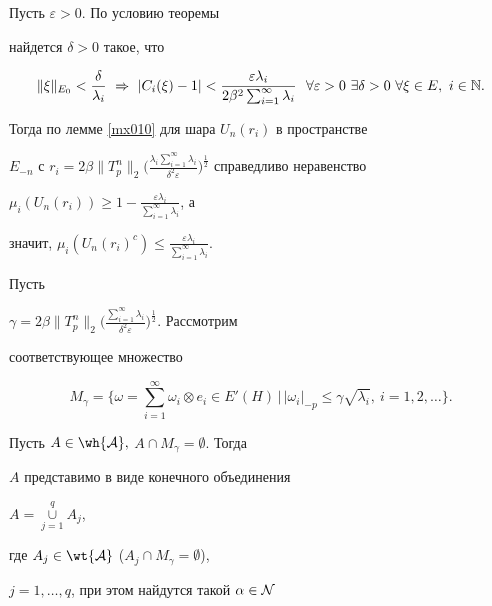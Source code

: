 \begin{pf}


Пусть $\varepsilon>0$. По условию теоремы


найдется $\delta>0$ такое, что


$$


\|\xi\|_{E_0}<\frac{\delta}{\lambda_i}\ \Rightarrow\


|C_i(\xi)-1 |<


\frac{\varepsilon\lambda_i}{2\beta^2\sum_{i=1}^{\infty}\lambda_i} \ \ 


\forall \varepsilon>0\ \exists \delta>0\ \forall \xi\in E, \ i\in\Bbb{N}.


$$


Тогда по лемме \ref{mx010} для шара $U_n(r_i)$ в пространстве


$E_{-n}$ с $r_i=2\beta\|T^n_p\|_2


\big(\frac{\lambda_i\sum_{i=1}^{\infty}\lambda_i}


{\delta^2\varepsilon}\big)^{\frac{1}{2}}$ справедливо неравенство


$\mu_i (U_n(r_i))\geq


1-\frac{\varepsilon\lambda_i}{\sum_{i=1}^{\infty}\lambda_i}$, а


значит, $\mu_i (U_n(r_i)^c)\leq


\frac{\varepsilon\lambda_i}{\sum_{i=1}^{\infty}\lambda_i}$.


Пусть


$\gamma=2\beta\|T^n_p\|_2 \big(\frac{\sum_{i=1}^{\infty}\lambda_i}


{\delta^2\varepsilon}\big)^{\frac{1}{2}}$. Рассмотрим


соответствующее множество


$$


M_\gamma= \bigg\{\omega=\sum_{i=1}^{\infty}\omega_i\otimes


e_i\in E'(H)\,\Big |\, |\omega_i|_{-p}\leq\gamma\sqrt{\lambda_i},\


i=1,2,\dotsc \bigg\}.


$$


Пусть $A\in\wh{\cal{A}},$ $A\cap M_\gamma=\emptyset$. Тогда


$A$ представимо в виде конечного объединения


$A=\mathop{\cup}\limits_{j=1}^q A_j$,


где $A_j\in\wt{\cal{A}}$ ($A_j\cap M_\gamma=\emptyset$),


$j=1,\dotsc, q$, при этом найдутся такой $\alpha\in\cal{N}$



\end{pf}
